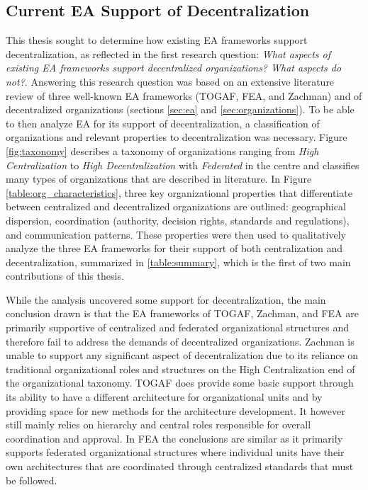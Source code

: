 \subsection{Current EA Support of Decentralization}

This thesis sought to determine how existing EA frameworks support decentralization, as reflected in the first research question: \textit{What aspects of existing EA frameworks support decentralized organizations? What aspects do not?}. Answering this research question was based on an extensive literature review of three well-known EA frameworks (TOGAF, FEA, and Zachman) and of decentralized organizations (sections \ref{sec:ea} and \ref{sec:organizations}). To be able to then analyze EA for its support of decentralization, a classification of organizations and relevant properties to decentralization was necessary. Figure \ref{fig:taxonomy} describes a taxonomy of organizations ranging from \textit{High Centralization} to \textit{High Decentralization} with \textit{Federated} in the centre and classifies many types of organizations that are described in literature. In Figure \ref{table:org_characteristics}, three key organizational properties that differentiate between centralized and decentralized organizations are outlined: geographical dispersion, coordination (authority, decision rights, standards and regulations), and communication patterns. These properties were then used to qualitatively analyze the three EA frameworks for their support of both centralization and decentralization, summarized in \ref{table:summary}, which is the first of two main contributions of this thesis.

While the analysis uncovered some support for decentralization, the main conclusion drawn is that the EA frameworks of TOGAF, Zachman, and FEA are primarily supportive of centralized and federated organizational structures and therefore fail to address the demands of decentralized organizations. Zachman is unable to support any significant aspect of decentralization due to its reliance on traditional organizational roles and structures on the High Centralization end of the organizational taxonomy. TOGAF does provide some basic support through its ability to have a different architecture for organizational units and by providing space for new methods for the architecture development. It however still mainly relies on hierarchy and central roles responsible for overall coordination and approval. In FEA the conclusions are similar as it primarily supports federated organizational structures where individual units have their own architectures that are coordinated through centralized standards that must be followed.


